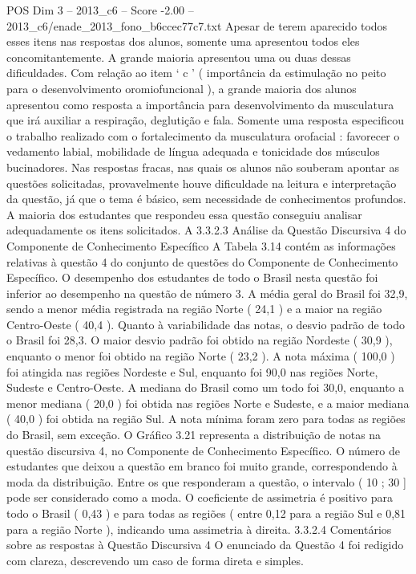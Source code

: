 \begin{textsample}{POS Dim 3 – 2013\_c6 – Score -2.00 – 2013\_c6/enade\_2013\_fono\_b6ccec77c7.txt}
Apesar de terem aparecido todos esses itens nas respostas dos alunos, somente uma apresentou todos eles concomitantemente.
A grande maioria apresentou uma ou duas dessas dificuldades.
Com relação ao item ‘ c ’ ( importância da estimulação no peito para o desenvolvimento oromiofuncional ), a grande maioria dos alunos apresentou como resposta a importância para desenvolvimento da musculatura que irá auxiliar a respiração, deglutição e fala.
Somente uma resposta especificou o trabalho realizado com o fortalecimento da musculatura orofacial : favorecer o vedamento labial, mobilidade de língua adequada e tonicidade dos músculos bucinadores.
Nas respostas fracas, nas quais os alunos não souberam apontar as questões solicitadas, provavelmente houve dificuldade na leitura e interpretação da questão, já que o tema é básico, sem necessidade de conhecimentos profundos.
A maioria dos estudantes que respondeu essa questão conseguiu analisar adequadamente os itens solicitados.
A 3.3.2.3 Análise da Questão Discursiva 4 do Componente de Conhecimento Específico A Tabela 3.14 contém as informações relativas à questão 4 do conjunto de questões do Componente de Conhecimento Específico.
O desempenho dos estudantes de todo o Brasil nesta questão foi inferior ao desempenho na questão de número 3.
A média geral do Brasil foi 32,9, sendo a menor média registrada na região Norte ( 24,1 ) e a maior na região Centro-Oeste ( 40,4 ).
Quanto à variabilidade das notas, o desvio padrão de todo o Brasil foi 28,3.
O maior desvio padrão foi obtido na região Nordeste ( 30,9 ), enquanto o menor foi obtido na região Norte ( 23,2 ).
A nota máxima ( 100,0 ) foi atingida nas regiões Nordeste e Sul, enquanto foi 90,0 nas regiões Norte, Sudeste e Centro-Oeste.
A mediana do Brasil como um todo foi 30,0, enquanto a menor mediana ( 20,0 ) foi obtida nas regiões Norte e Sudeste, e a maior mediana ( 40,0 ) foi obtida na região Sul.
A nota mínima foram zero para todas as regiões do Brasil, sem exceção.
O Gráfico 3.21 representa a distribuição de notas na questão discursiva 4, no Componente de Conhecimento Específico.
O número de estudantes que deixou a questão em branco foi muito grande, correspondendo à moda da distribuição.
Entre os que responderam a questão, o intervalo ( 10 ; 30 ] pode ser considerado como a moda.
O coeficiente de assimetria é positivo para todo o Brasil ( 0,43 ) e para todas as regiões ( entre 0,12 para a região Sul e 0,81 para a região Norte ), indicando uma assimetria à direita. 3.3.2.4 Comentários sobre as respostas à Questão Discursiva 4 O enunciado da Questão 4 foi redigido com clareza, descrevendo um caso de forma direta e simples.

\end{textsample}
